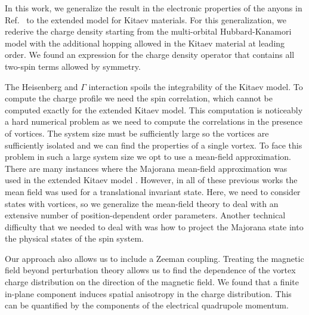 In this work, we generalize the result in the electronic properties of the anyons in Ref.~\cite{Pereira2020} to the extended model for Kitaev materials.
For this generalization, we rederive the charge density starting from the multi-orbital Hubbard-Kanamori model with the additional hopping allowed in the Kitaev material at leading order.
We found an expression for the charge density operator that contains all two-spin terms allowed by symmetry.

The Heisenberg and $\Gamma$ interaction spoils the integrability of the Kitaev model.
To compute the charge profile we need the spin correlation, which cannot be computed exactly for the extended Kitaev model.
This computation is noticeably a hard numerical problem as we need to compute the correlations in the presence of vortices. The system size must be sufficiently large so the vortices are sufficiently isolated and we can find the properties of a single vortex.
To face this problem in such a large system size we opt to use a mean-field approximation. There are many instances where the Majorana mean-field approximation was used in the extended Kitaev model \cite{Knolle2018,Liang2018,Nasu2018,Gohlke2018,Go2019,Ralko2020,Li2022,Yilmaz2022,Merino2022}. However, in all of these previous works the mean field was used for a translational invariant state. Here, we need to consider states with vortices, so we generalize the mean-field theory to deal with an extensive number of position-dependent order parameters.
Another technical difficulty that we needed to deal with was how to project the Majorana state into the physical states of the spin system.

Our approach also allows us to include a Zeeman coupling.
Treating the magnetic field beyond perturbation theory allows us to find the dependence of the vortex charge distribution on the direction of the magnetic field.
We found that a finite in-plane component induces spatial anisotropy in the charge distribution.
This can be quantified by the components of the electrical quadrupole momentum.

